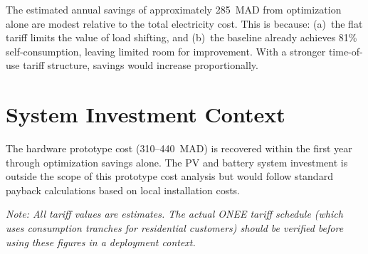 The estimated annual savings of approximately 285~MAD from optimization alone are modest relative to the total electricity cost. This is because: (a)~the flat tariff limits the value of load shifting, and (b)~the baseline already achieves 81\% self-consumption, leaving limited room for improvement. With a stronger time-of-use tariff structure, savings would increase proportionally.

\section{System Investment Context}

The hardware prototype cost (310--440~MAD) is recovered within the first year through optimization savings alone. The PV and battery system investment is outside the scope of this prototype cost analysis but would follow standard payback calculations based on local installation costs.

\textit{Note: All tariff values are estimates. The actual ONEE tariff schedule (which uses consumption tranches for residential customers) should be verified before using these figures in a deployment context.}
